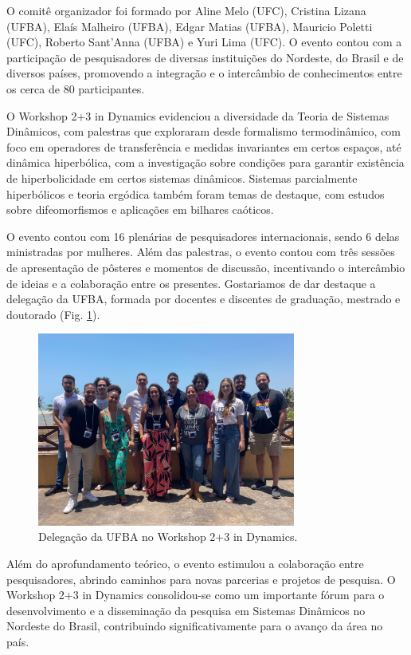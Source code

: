 \documentclass{hipatia}
\begin{document}
O comitê organizador foi formado por Aline Melo (UFC), Cristina Lizana (UFBA), Elaís Malheiro (UFBA), Edgar Matias (UFBA), Mauricio Poletti (UFC), Roberto Sant'Anna (UFBA) e Yuri Lima (UFC). O evento contou com a participação de pesquisadores de diversas instituições do Nordeste, do Brasil e de diversos países, promovendo a integração e o intercâmbio de conhecimentos entre os cerca de 80 participantes.


O Workshop 2+3 in Dynamics evidenciou a diversidade da Teoria de Sistemas Dinâmicos, com palestras que exploraram desde formalismo termodinâmico, com foco em operadores de transferência e medidas invariantes em certos espaços, até dinâmica hiperbólica, com a investigação sobre condições para garantir existência de hiperbolicidade em certos sistemas dinâmicos.  Sistemas parcialmente hiperbólicos e teoria ergódica também foram temas de destaque, com estudos sobre  difeomorfismos e  aplicações em  bilhares caóticos.

 O evento contou com 16 plenárias de pesquisadores internacionais, sendo 6 delas ministradas por mulheres. Além das palestras, o evento contou com três sessões de apresentação de pôsteres e momentos de discussão, incentivando o intercâmbio de ideias e a colaboração entre os presentes. Gostariamos de dar destaque a delegação da UFBA, formada por docentes e discentes de graduação, mestrado e doutorado (Fig. \ref{workshop1}).


\begin{figure}[htb]
    \centering
    \includegraphics[width=8.5cm]{Workshop1.jpg}
    \caption{Delegação da UFBA no Workshop 2+3 in Dynamics.}
 \label{workshop1}
\end{figure}


Além do aprofundamento teórico, o evento estimulou a colaboração entre pesquisadores, abrindo caminhos para novas parcerias e projetos de pesquisa.  O Workshop 2+3 in Dynamics consolidou-se como um importante fórum para o desenvolvimento e a disseminação da pesquisa em Sistemas Dinâmicos no Nordeste do Brasil, contribuindo significativamente para o avanço da área no país.
\end{document}
